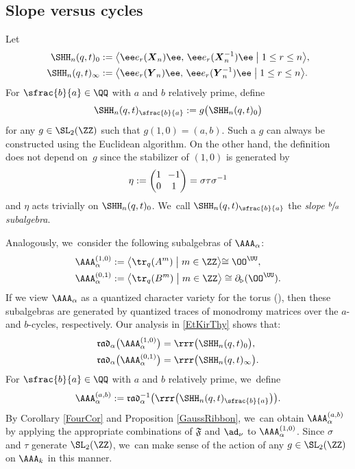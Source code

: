 \subsection{Slope versus cycles}
Let
\begin{equation*}
\begin{aligned}
\SHH_n(q,t)_0&:=\bigl\langle\ee e_r(\boldsymbol{X}_n)\ee,\,\ee e_r(\boldsymbol{X}_n^{-1})\ee\bigm| 1\le r\le n\bigr\rangle,
\\
\SHH_n(q,t)_\infty&:=\bigl\langle\ee e_r(\boldsymbol{Y}_n)\ee,\, \ee e_r(\boldsymbol{Y}_n^{-1})\ee\bigm| 1\le r\le n\bigr\rangle.
\end{aligned}
\end{equation*}
For $\sfrac{b}{a}\in\QQ$ with $a$ and $b$ relatively prime, define
\[
\SHH_n(q,t)_{\sfrac{b}{a}}:=g\bigl(\SHH_n(q,t)_0\bigr)
\]
for any $g\in \SL_2(\ZZ)$ such that $g(1,0)=(a,b)$.
Such a $g$ can always be constructed using the Euclidean algorithm.
On the other hand, the definition does not depend on~$g$ since the stabilizer of $(1,0)$ is generated by
\[\arraycolsep3.5pt
\eta:=
\begin{pmatrix}
1 & -1\\
0 & 1
\end{pmatrix}
=\sigma\tau\sigma^{-1}
\]
and $\eta$ acts trivially on $\SHH_n(q,t)_0$. We~call $\SHH_n(q,t)_{\sfrac{b}{a}}$ the \textit{slope $\sfrac{b}{a}$ subalgebra}.

Analogously, we~consider the following subalgebras of $\AAA_\alpha$:
\begin{align*}
\AAA_\alpha^{(1,0)}&:=\bigl\langle\tr_q(A^m)\bigm| m\in\ZZ\bigl\rangle\cong\OO^\UU,\\
\AAA_\alpha^{(0,1)}&:=\bigl\langle\tr_q(B^m)\bigm| m\in\ZZ\bigr\rangle\cong\partial_{\triangleright}(\OO^\UU).
\end{align*}
If we view $\AAA_\alpha$ as a quantized character variety for the torus (\cf \cite{AlekScho, BBJ1, BBJ2}), then these subalgebras are generated by quantized traces of monodromy matrices over the $a$- and $b$-cycles, respectively.
Our analysis in \ref{EtKirThy} shows that:
\begin{align*}
\mathfrak{rad}_\alpha\bigl(\AAA_\alpha^{(1,0)}\bigr)&=\rrr\bigl(\SHH_n(q,t)_0\bigr),\\
\mathfrak{rad}_\alpha\bigl(\AAA_\alpha^{(0,1)}\bigr)&= \rrr\bigl(\SHH_n(q,t)_\infty\bigr).
\end{align*}
For $\sfrac{b}{a}\in\QQ$ with $a$ and $b$ relatively prime, we~define
\[
\AAA_{\alpha}^{(a,b)}:=\mathfrak{rad}_\alpha^{-1}\bigl(\rrr\bigl(\SHH_n(q,t)_{\sfrac{b}{a}} \bigr) \bigr).
\]
By Corollary \ref{FourCor} and Proposition \ref{GaussRibbon}, we~can obtain $\AAA_{\alpha}^{(a,b)}$ by applying the appropriate combinations of $\mathfrak{F}$ and $\ad_{\nu}$ to $\AAA_{\alpha}^{(1,0)}$.
Since $\sigma$ and $\tau$ generate $\SL_2(\ZZ)$, we~can make sense of the action of any $g\in \SL_2(\ZZ)$ on $\AAA_k$ in this manner.


